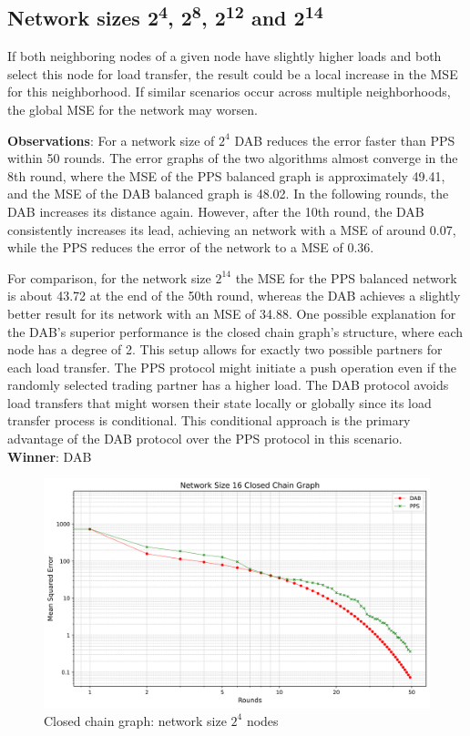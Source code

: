 \subsection{Network sizes 2\textsuperscript{4}, 2\textsuperscript{8}, 2\textsuperscript{12} and 2\textsuperscript{14}}
If both neighboring nodes of a given node have slightly higher loads and both select this node for load transfer, the result could be a local increase in the MSE for this neighborhood. If similar scenarios occur across multiple neighborhoods, the global MSE for the network may worsen.


\textbf{Observations}: For a network size of $2^{4}$ DAB reduces the error faster than PPS within 50 rounds. The error graphs of the two algorithms almost converge in the 8th round, where the MSE of the PPS balanced graph is approximately 49.41, and the MSE of the DAB balanced graph is 48.02. In the following rounds, the DAB increases its distance again. However, after the 10th round, the DAB consistently increases its lead, achieving an network with a MSE of around 0.07, while the PPS reduces the error of the network to a MSE of 0.36.

For comparison, for the network size $2^{14}$ the MSE for the PPS balanced network is about 43.72 at the end of the 50th round, whereas the DAB achieves a slightly better result for its network with an MSE of 34.88. One possible explanation for the DAB’s superior performance is the closed chain graph's structure, where each node has a degree of 2. This setup allows for exactly two possible partners for each load transfer. The PPS protocol might initiate a push operation even if the randomly selected trading partner has a higher load. The DAB protocol avoids load transfers that might worsen their state locally or globally since its load transfer process is conditional. This conditional approach is the primary advantage of the DAB protocol over the PPS protocol in this scenario.\\
\textbf{Winner}: DAB
\begin{figure}[H]
    \centering
    \includegraphics[scale=0.5]{figures/closedChainSimulations/DAB_vs_PPS_CCG_r50_n16.png}
    \caption{Closed chain graph: network size $2^{4}$ nodes}
    \label{fig:16ChainGraph}
\end{figure}

